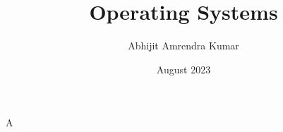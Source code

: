 \documentclass{report}
\title{Operating Systems}
\author{Abhijit Amrendra Kumar}
\date{August 2023}
\begin{document}
\maketitle

A
\end{document}
